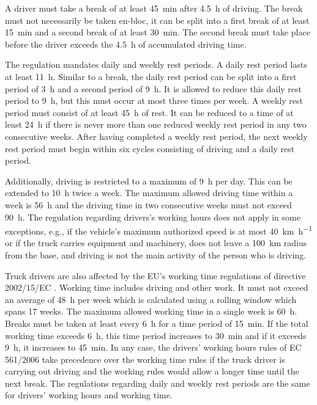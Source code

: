 A driver must take a break of at least \SI{45}{\minute} after \SI{4.5}{\hour} of driving. The break must not necessarily be taken en-bloc, it can be split into a first break of at least \SI{15}{\minute} and a second break of at least \SI{30}{\minute}. The second break must take place before the driver exceeds the \SI{4.5}{\hour} of accumulated driving time.

The regulation mandates daily and weekly rest periods. A daily rest period lasts at least \SI{11}{\hour}. Similar to a break, the daily rest period can be split into a first period of \SI{3}{\hour} and a second period of \SI{9}{\hour}. It is allowed to reduce this daily rest period to \SI{9}{\hour}, but this must occur at most three times per week. A weekly rest period must consist of at least \SI{45}{\hour} of rest. It can be reduced to a time of at least \SI{24}{\hour} if there is never more than one reduced weekly rest period in any two consecutive weeks. After having completed a weekly rest period, the next weekly rest period must begin within six cycles consisting of driving and a daily rest period.

Additionally, driving is restricted to a maximum of \SI{9}{\hour} per day. This can be extended to \SI{10}{\hour} twice a week. The maximum allowed driving time within a week is \SI{56}{\hour} and the driving time in two consecutive weeks must not exceed \SI{90}{\hour}. The regulation regarding drivers's working hours does not apply in some exceptions, e.g., if the vehicle's maximum authorized speed is at most \SI[per-mode = symbol]{40}{\kilo\meter\per\hour} or if the truck carries equipment and machinery, does not leave a \SI{100}{\kilo\meter} radius from the base, and driving is not the main activity of the person who is driving.

Truck drivers are also affected by the EU's working time regulations of directive 2002/15/EC \cite{europeanparliament:2002}. Working time includes driving and other work. It must not exceed an average of \SI{48}{\hour} per week which is calculated using a rolling window which spans 17 weeks. The maximum allowed working time in a single week is \SI{60}{\hour}. Breaks must be taken at least every \SI{6}{\hour} for a time period of \SI{15}{\minute}. If the total working time exceeds \SI{6}{\hour}, this time period increases to \SI{30}{\minute} and if it exceeds \SI{9}{\hour}, it increases to \SI{45}{\minute}. In any case, the drivers' working hours rules of EC 561/2006 take precedence over the working time rules if the truck driver is carrying out driving and the working rules would allow a longer time until the next break. The regulations regarding daily and weekly rest periods are the same for drivers' working hours and working time.

